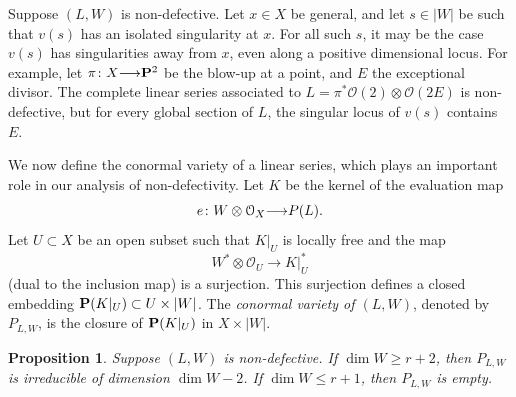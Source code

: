 \documentclass[11pt,reqno]{amsart}
\theoremstyle{plain}
\newtheorem{proposition}[theorem]{Proposition}
\theoremstyle{definition}
\theoremstyle{remark}
\numberwithin{equation}{section}
\renewcommand{\to}{{\longrightarrow}}
\numberwithin{equation}{section}
\renewcommand{\O}{\mathcal O}
\begin{document}
\begin{remark}
  Suppose $(L, W)$ is non-defective.
  Let $x \in X$ be general, and let $s \in |W|$ be such that $v(s)$ has an isolated singularity at $x$.
  For all such $s$, it may be the case $v(s)$ has singularities away from $x$, even along a positive dimensional locus.
  For example, let $\pi \from X \to \P^2$  be the blow-up at a point, and $E$ the exceptional divisor.
  The complete linear series associated to $L = \pi^* \O(2) \otimes \O(2E)$ is non-defective, but for every global section of $L$, the singular locus of $v(s)$ contains $E$.
\end{remark}


We now define the conormal variety of a linear series, which plays an important role in our analysis of non-defectivity.
Let $K$ be the kernel of the evaluation map
\[ e \from W \otimes \O_X \to P(L).\]
Let $U \subset X$ be an open subset such that $K|_U$ is locally free and the map
\[W^* \otimes \O_U \to K|_U^*\]
(dual to the inclusion map) is a surjection.
This surjection defines a closed embedding $\P(K|_U) \subset U \times |W|$.
The \emph{conormal variety of $(L,W)$}, denoted by $P_{L,W}$, is the closure of $\P(K|_U)$ in $X \times |W|$.

\begin{proposition}\label{prop:dimension}
  \label{prop:dimP}
  Suppose $(L, W)$ is non-defective.
  If $\dim W \geq r+2$, then $P_{L,W}$ is irreducible of dimension $\dim W - 2$.
  If $\dim W \leq r+1$, then $P_{L,W}$ is empty.
\end{proposition} 
\end{document}
